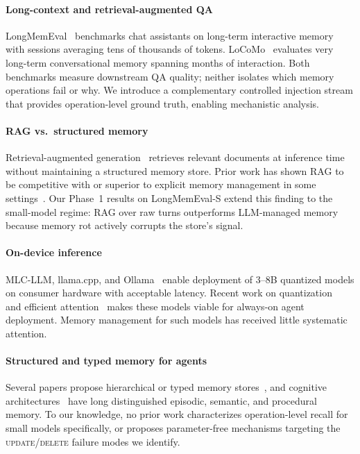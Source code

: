 \documentclass[10pt, twocolumn]{article}
\begin{document}
\paragraph{Long-context and retrieval-augmented QA}
LongMemEval~\cite{wu2024longmemeval} benchmarks chat assistants on long-term
interactive memory with sessions averaging tens of thousands of tokens.
LoCoMo~\cite{maharana2024evaluating} evaluates very long-term conversational
memory spanning months of interaction.
Both benchmarks measure downstream QA quality; neither isolates which
memory operations fail or why.
We introduce a complementary controlled injection stream that provides
operation-level ground truth, enabling mechanistic analysis.

\paragraph{RAG vs.\ structured memory}
Retrieval-augmented generation~\cite{lewis2020retrieval} retrieves relevant
documents at inference time without maintaining a structured memory store.
Prior work has shown RAG to be competitive with or superior to explicit
memory management in some settings~\cite{shi2023large}.
Our Phase~1 results on LongMemEval-S extend this finding to the small-model
regime: RAG over raw turns outperforms LLM-managed memory because memory
rot actively corrupts the store's signal.

\paragraph{On-device inference}
MLC-LLM, llama.cpp, and Ollama~\cite{ollama2024} enable deployment of
3--8B quantized models on consumer hardware with acceptable latency.
Recent work on quantization~\cite{dettmers2022gptq} and efficient
attention~\cite{dao2022flashattention} makes these models viable for
always-on agent deployment.
Memory management for such models has received little systematic attention.

\paragraph{Structured and typed memory for agents}
Several papers propose hierarchical or typed memory
stores~\cite{zhong2024memorybank,zhang2024survey}, and cognitive
architectures~\cite{anderson1983architecture} have long distinguished
episodic, semantic, and procedural memory.
To our knowledge, no prior work characterizes operation-level recall
for small models specifically, or proposes parameter-free mechanisms
targeting the \textsc{update}/\textsc{delete} failure modes we identify.
\end{document}
